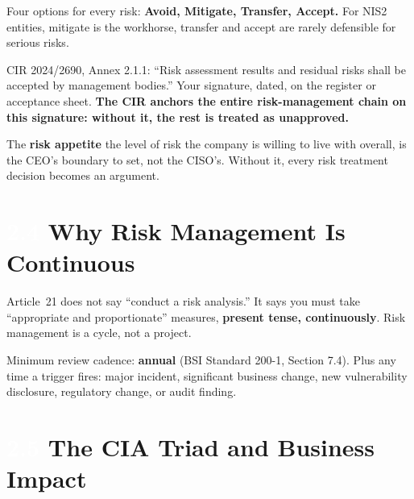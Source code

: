 \documentclass[11pt,a4paper,twoside]{book}
\newcommand{\lessontag}[1]{%
  \texorpdfstring{%
    \setlength{\fboxsep}{3pt}\colorbox{nisd2blue}{\textcolor{white}{\footnotesize\bfseries #1}}\quad%
  }{Lesson #1\ }%
}
\begin{document}
Four options for every risk: \textbf{Avoid, Mitigate, Transfer, Accept.} For NIS2 entities, mitigate is the workhorse, transfer and accept are rarely defensible for serious risks.

\begin{warningbox}
CIR 2024/2690, Annex 2.1.1: ``Risk assessment results and residual risks shall be accepted by management bodies.'' Your signature, dated, on the register or acceptance sheet. \textbf{The CIR anchors the entire risk-management chain on this signature: without it, the rest is treated as unapproved.}
\end{warningbox}

The \textbf{risk appetite} the level of risk the company is willing to live with overall, is the CEO's boundary to set, not the CISO's. Without it, every risk treatment decision becomes an argument.

\section{\lessontag{2.4}Why Risk Management Is Continuous}

Article~21 does not say ``conduct a risk analysis.'' It says you must take ``appropriate and proportionate'' measures, \textbf{present tense, continuously}. Risk management is a cycle, not a project.

Minimum review cadence: \textbf{annual} (BSI Standard 200-1, Section 7.4). Plus any time a trigger fires: major incident, significant business change, new vulnerability disclosure, regulatory change, or audit finding.

\section{\lessontag{2.5}The CIA Triad and Business Impact}

\begin{center}
\end{center}
\end{document}
